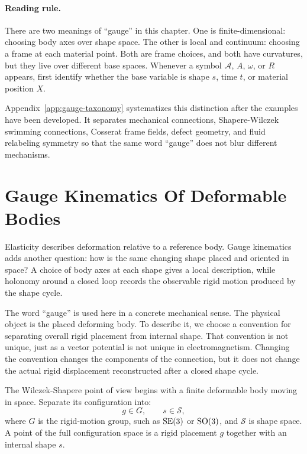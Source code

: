 \paragraph{Reading rule.}
There are two meanings of ``gauge'' in this chapter. One is finite-dimensional:
choosing body axes over shape space. The other is local and continuum: choosing
a frame at each material point. Both are frame choices, and both have
curvatures, but they live over different base spaces. Whenever a symbol
\(\mathcal A\), \(A\), \(\omega\), or \(R\) appears, first identify whether the
base variable is shape \(s\), time \(t\), or material position \(X\).

Appendix~\ref{app:gauge-taxonomy} systematizes this distinction after the
examples have been developed. It separates mechanical connections,
Shapere-Wilczek swimming connections, Cosserat frame fields, defect geometry,
and fluid relabeling symmetry so that the same word ``gauge'' does not blur
different mechanisms.

\section{Gauge Kinematics Of Deformable Bodies}
\label{sec:gauge-kinematics-deformable-bodies}

Elasticity describes deformation relative to a reference body. Gauge kinematics
adds another question: how is the same changing shape placed and oriented in
space? A choice of body axes at each shape gives a local description, while
holonomy around a closed loop records the observable rigid motion produced by
the shape cycle.

The word ``gauge'' is used here in a concrete mechanical sense.  The physical
object is the placed deforming body.  To describe it, we choose a convention
for separating overall rigid placement from internal shape.  That convention
is not unique, just as a vector potential is not unique in electromagnetism.
Changing the convention changes the components of the connection, but it does
not change the actual rigid displacement reconstructed after a closed shape
cycle.

The Wilczek-Shapere point of view begins with a finite deformable body moving in
space. Separate its configuration into:
\[
  g\in G,\qquad s\in\mathcal S,
\]
where \(G\) is the rigid-motion group, such as \(\operatorname{SE}(3)\) or \(\operatorname{SO}(3)\), and
\(\mathcal S\) is shape space. A point of the full configuration space is a
rigid placement \(g\) together with an internal shape \(s\).

